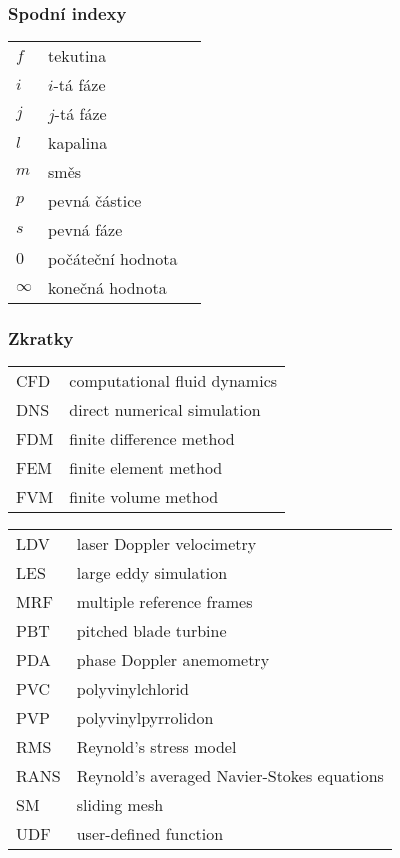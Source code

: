 \subsubsection*{Spodní indexy}
\begin{tabularx}{\textwidth}{@{}p{2.5cm} X r@{}}

$f$ & tekutina & \\
$i$ & $i$-tá fáze & \\
$j$ & $j$-tá fáze & \\
$l$ & kapalina & \\
$m$ & směs & \\
$p$ & pevná částice & \\
$s$ & pevná fáze & \\
$0$ & počáteční hodnota & \\
$\infty$ & konečná hodnota & \\
\end{tabularx}

\subsubsection*{Zkratky}
\begin{tabularx}{\textwidth}{@{}p{2.5cm} X }
	
CFD & computational fluid dynamics  \\
DNS & direct numerical simulation \\
FDM & finite difference method  \\
FEM & finite element method  \\
FVM & finite volume method  \\

\end{tabularx}
\begin{tabularx}{\textwidth}{@{}p{2.5cm} X }
LDV & laser Doppler velocimetry  \\
LES & large eddy simulation \\
MRF & multiple reference frames \\
PBT & pitched blade turbine \\
PDA & phase Doppler anemometry \\
PVC & polyvinylchlorid \\
PVP & polyvinylpyrrolidon \\
RMS & Reynold's stress model\\
RANS & Reynold's averaged Navier-Stokes equations \\
SM & sliding mesh \\
UDF & user-defined function \\
\end{tabularx}
